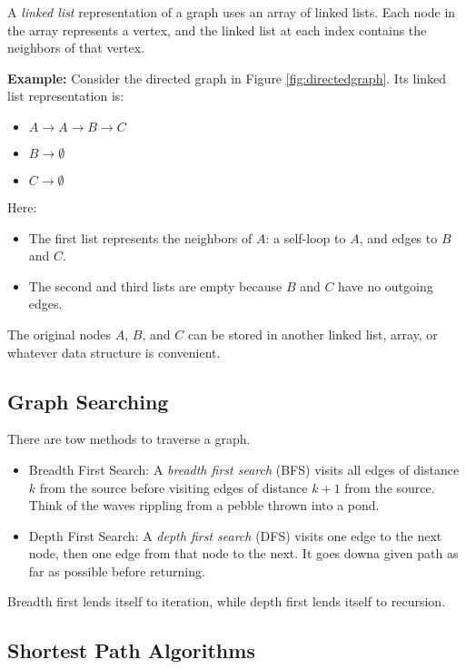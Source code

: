 A \emph{linked list} representation of a graph uses an array of linked lists. Each node in the array represents a vertex, and the linked list at each index contains the neighbors of that vertex.

\textbf{Example:} Consider the directed graph in Figure \ref{fig:directedgraph}. Its linked list representation is:

\begin{itemize}
    \item $A \to A \to B \to C$
    \item $B \to \emptyset$
    \item $C \to \emptyset$
\end{itemize}

Here:
\begin{itemize}
    \item The first list represents the neighbors of $A$:
          a self-loop to $A$, and edges to $B$ and $C$.
    \item The second and third lists are empty because $B$ and
          $C$ have no outgoing edges.
\end{itemize}

The original nodes $A$, $B$, and $C$ can be stored in another
linked list, array, or whatever data structure is convenient.

\subsection{Graph Searching}

There are tow methods to traverse a graph.

\begin{itemize}
    \item Breadth First Search:
          A \emph{breadth first search} (BFS) visits all edges of distance $k$ from
          the source before visiting edges of distance $k+1$ from the source.
          Think of the waves rippling from a pebble thrown into a pond.
    \item Depth First Search:
          A \emph{depth first search} (DFS) visits one edge to the next node, then one edge from
          that node to the next. It goes downa  given path as far as possible
          before returning.
\end{itemize}

Breadth first lends itself to iteration, while depth first lends itself
to recursion.

\subsection{Shortest Path Algorithms}

